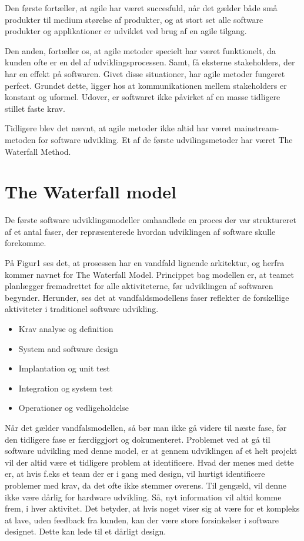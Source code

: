 Den første fortæller, at agile har været succesfuld, når det gælder både små produkter til medium størelse af produkter, og at stort set alle software produkter og applikationer er udviklet ved brug af en agile tilgang.

Den anden, fortæller os, at agile metoder specielt har været funktionelt, da kunden ofte er  en del af udviklingsprocessen. Samt, få eksterne stakeholders, der har en effekt på softwaren. \cite{Sommerville}
Givet disse situationer, har agile metoder fungeret perfect. Grundet dette, ligger hos at kommunikationen mellem stakeholders er konstant og uformel. Udover, er softwaret ikke påvirket af en masse tidligere stillet faste krav.

Tidligere blev det nævnt, at agile metoder ikke altid har været mainstream-metoden for software udvikling. Et af de første udvilingsmetoder har været The Waterfall Method.

\section{The Waterfall model}
De første software udviklingsmodeller omhandlede en proces der var struktureret af et antal faser, der repræsenterede hvordan udviklingen af software skulle forekomme. \cite{Sommerville}



På Figur1 ses det, at prosessen har en vandfald lignende arkitektur, og herfra kommer navnet for The Waterfall Model. Princippet bag modellen er, at teamet planlægger fremadrettet for alle aktiviteterne, før udviklingen af softwaren begynder. Herunder, ses det at vandfaldsmodellens faser reflekter de forskellige aktiviteter i traditionel software udvikling. \cite{Sommerville}
\begin{itemize}
    \item Krav analyse og definition
    \item System and software design
    \item Implantation og unit test
    \item Integration og system test
    \item Operationer og vedligeholdelse
\end{itemize}

Når det gælder vandfalsmodellen, så bør man ikke gå videre til næste fase, før den tidligere fase er færdiggjort og dokumenteret. Problemet ved at gå til software udvikling med denne model, er at gennem udviklingen af et helt projekt vil der altid være et tidligere problem at identificere. Hvad der menes med dette er, at hvis f.eks et team der er i gang med design, vil hurtigt identificere problemer med krav, da det ofte ikke stemmer overens. Til gengæld, vil denne ikke være dårlig for hardware udvikling. Så, nyt information vil altid komme frem, i hver aktivitet. Det betyder, at hvis noget viser sig at være for et kompleks at lave, uden feedback fra kunden, kan der være store forsinkelser i software designet. Dette kan lede til et dårligt design. \cite{Sommerville}

